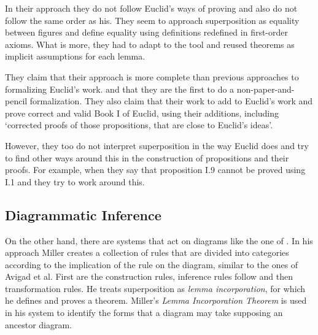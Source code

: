 \documentclass[]{interact}
\theoremstyle{plain}
\theoremstyle{definition}
\theoremstyle{remark}
\newcommand{\term}[1]{\emph{#1\/}}
\newcommand{\quotes}[1]{`#1'}
\begin{document}

In their approach they do not follow Euclid's ways of proving and also
do not follow the same order as his. They seem to approach
superposition as equality between figures and define equality using 
\citet{hartshorne:2000} definitions redefined in first-order axioms.
What is more, they had to adapt to the tool and
reused theorems as implicit assumptions for each lemma.


They claim that their approach is more complete than previous
approaches to formalizing Euclid's work.  and that they are the first
to do a non-paper-and-pencil formalization.
They also claim that their work to add to Euclid's work and prove correct and 
valid Book I of Euclid, using their additions, including \quotes{corrected 
proofs of those propositions, that are close to Euclid's ideas}.


However, they too do not interpret superposition in the way Euclid
does and try to find other ways around this in the construction of
propositions and their proofs. For example, when they say that
proposition I.9 cannot be proved using I.1 and they try to work around
this.


\subsection{Diagrammatic Inference}
\label{sec:diagr-infer}

On the other hand, there are systems that act on diagrams like the one
of \citet{miller:2001}. In his approach Miller creates a
collection of rules that are divided into categories according to the
implication of the rule on the diagram, similar to the ones of Avigad
et al. First are the construction rules, inference rules follow and
then transformation rules. He treats superposition as
\term{lemma incorporation}, for which he defines and proves a theorem.
Miller's \term{Lemma Incorporation Theorem} is used in his system to
identify the forms that a diagram may take supposing an ancestor diagram.
\end{document}
